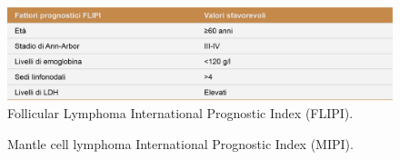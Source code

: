 \begin{figure}[H]
    \begin{center}
    \includegraphics[width=0.6\columnwidth]{img/FLIPI.png}
    \vspace{-3mm}
    \end{center}
    \caption{Follicular Lymphoma International Prognostic Index (FLIPI).
    \cite{img19}}
    \label{fig:FIGURE_2.17}
\end{figure}

\begin{figure}[H]
    \begin{center}
    \vspace{-3mm}
    \end{center}
    \caption{Mantle cell lymphoma International Prognostic Index (MIPI).
    \cite{MIPI}}
\label{fig:FIGURE_2.18}
\end{figure}

